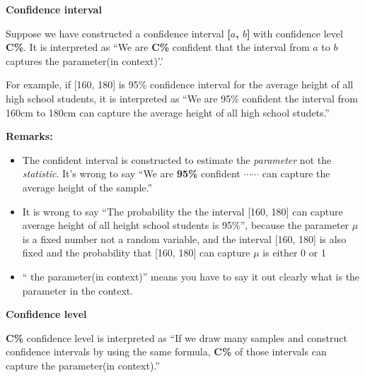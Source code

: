 \documentclass[a4paper, 12pt,twoside]{book}
\begin{document}
\begin{itemize}
      \colorbox{babypink}{\parbox{\textwidth}{
            \textbf{Confidence interval} \vspace{0.3cm}
      
      Suppose we have constructed a confidence interval \textbf{[$a$, $b$]} with confidence level \textbf{C\%}.  It is interpreted as ``We are \textbf{C\%} confident that the interval from $a$ to $b$ captures the parameter(in context)'.'
      }}\vspace{0.3cm}
      
      For example, if [160, 180] is 95\% confidence interval for the average height of all high school students, it is interpreted as ``We are 95\% confident the interval from 160cm to 180cm can capture the average height of all high school studets.''\vspace{0.3cm}
      
      \colorbox{babypink}{\parbox{\textwidth}{
            \textbf{Remarks:}
      \begin{itemize}[leftmargin = 0.5cm]
         \item The confident interval is constructed to estimate the \textit{parameter} not the \textit{statistic}. It's wrong to say ``We are \textbf{95\%} confident $\cdots\cdots$ can capture the average height of the sample.''
         \item It is wrong to say ``The probability the the interval [160, 180] can capture average height of all height school students is 95\%'', because the parameter $\mu$ is a fixed number not a random variable, and the interval [160, 180] is also fixed and the probability that [160, 180] can capture $\mu$ is either 0 or 1
         \item `` the parameter(in context)'' means you have to say it out clearly what is the parameter in the context. 
      \end{itemize}
      }}      

      \vspace{0.6cm}
         
         \colorbox{babypink}{\parbox{\textwidth}{
         \textbf{Confidence level}\vspace{0.3cm}
         
         \textbf{C\%} confidence level is interpreted as ``If we draw many samples and construct confidence intervals by using the same formula, \textbf{C\%} of those intervals can capture the parameter(in context).''
         }}\vspace{0.6cm}
         

\end{itemize}
\end{document}
